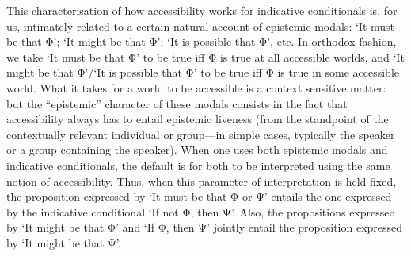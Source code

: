 This characterisation of how accessibility works for indicative
conditionals is, for us, intimately related to a certain natural account
of epistemic modals: `It must be that Φ'; `It might be that Φ'; `It is
possible that Φ', etc. In orthodox fashion, we take `It must be that Φ'
to be true iff Φ is true at all accessible worlds, and `It might be that
Φ'/`It is possible that Φ' to be true iff Φ is true in some accessible
world. What it takes for a world to be accessible is a context sensitive
matter: but the ``epistemic'' character of these modals consists in the
fact that accessibility always has to entail epistemic liveness (from
the standpoint of the contextually relevant individual or group---in
simple cases, typically the speaker or a group containing the speaker).
When one uses both epistemic modals and indicative conditionals, the
default is for both to be interpreted using the same notion of
accessibility. Thus, when this parameter of interpretation is held
fixed, the proposition expressed by `It must be that Φ or Ψ' entails the
one expressed by the indicative conditional `If not Φ, then Ψ'. Also,
the propositions expressed by `It might be that Φ' and `If Φ, then Ψ'
jointly entail the proposition expressed by `It might be that Ψ'.

